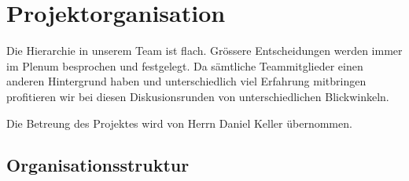 \documentclass[a4paper]{article}
\let\oldsection\section
\renewcommand\section{\clearpage\oldsection}
\begin{document}
\section{Projektorganisation}
Die Hierarchie in unserem Team ist flach.
Grössere Entscheidungen werden immer im Plenum besprochen und festgelegt.
Da sämtliche Teammitglieder einen anderen Hintergrund haben und unterschiedlich viel Erfahrung mitbringen profitieren wir bei diesen Diskusionsrunden von unterschiedlichen Blickwinkeln.

Die Betreung des Projektes wird von Herrn Daniel Keller übernommen.

\subsection{Organisationsstruktur}
\end{document}
